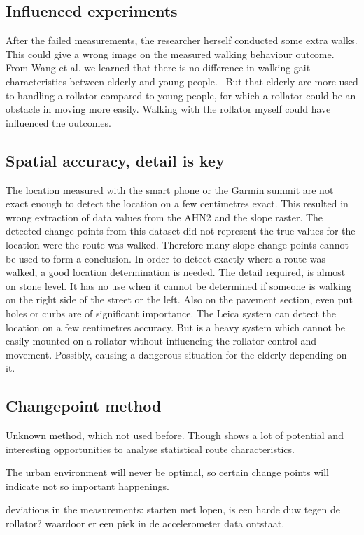 \subsection{Influenced experiments}
After the failed measurements, the researcher herself conducted some extra walks. This could give a wrong image on the measured walking behaviour outcome. From Wang et al. we learned that there is no difference in walking gait characteristics between elderly and young people.~\cite{Wang2015} But that elderly are more used to handling a rollator compared to young people, for which a rollator could be an obstacle in moving more easily. Walking with the rollator myself could have influenced the outcomes. 

\subsection{Spatial accuracy, detail is key}
The location measured with the smart phone  or the Garmin summit are not exact enough to detect the location on a few centimetres exact. This resulted in wrong extraction of data values from the AHN2 and the slope raster. The detected change points from this dataset did not represent the true values for the location were the route was walked. Therefore many slope change points cannot be used to form a conclusion. In order to detect exactly where a route was walked, a good location determination is needed. The detail required, is almost on stone level. It has no use when it cannot be determined if someone is walking on the right side of the street or the left. Also on the pavement section, even put holes or curbs are of significant importance. The Leica system can detect the location on a few centimetres accuracy. But is a heavy system which cannot be easily mounted on a rollator without influencing the rollator control and movement. Possibly, causing a dangerous situation for the elderly depending on it. 

\subsection{Changepoint method}
Unknown method, which not used before. Though shows a lot of potential and interesting opportunities to analyse statistical route characteristics. 

The urban environment will never be optimal, so certain change points will indicate not so important happenings. 

deviations in the measurements:
starten met lopen, is een harde duw tegen de rollator? waardoor er een piek in de accelerometer data ontstaat. 


